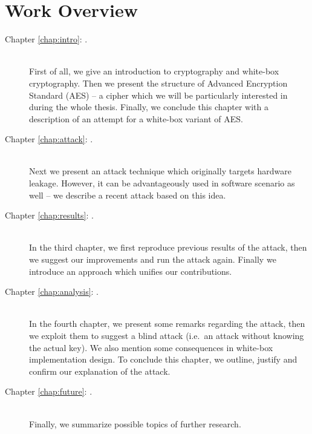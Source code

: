 \section*{Work Overview}
	\begin{description}
		\item[Chapter \ref{chap:intro}: .] ~ \\
			First of all, we give an introduction to cryptography and white-box cryptography. Then we present the structure of Advanced Encryption Standard (AES) -- a cipher which we will be particularly interested in during the whole thesis. Finally, we conclude this chapter with a description of an attempt for a white-box variant of AES.
		\item[Chapter \ref{chap:attack}: .] ~ \\
			Next we present an attack technique which originally targets hardware leakage. However, it can be advantageously used in software scenario as well -- we describe a recent attack based on this idea.
		\item[Chapter \ref{chap:results}: .] ~ \\
			In the third chapter, we first reproduce previous results of the attack, then we suggest our improvements and run the attack again. Finally we introduce an approach which unifies our contributions.
		\item[Chapter \ref{chap:analysis}: .] ~ \\
			In the fourth chapter, we present some remarks regarding the attack, then we exploit them to suggest a blind attack (i.e.\ an attack without knowing the actual key). We also mention some consequences in white-box implementation design. To conclude this chapter, we outline, justify and confirm our explanation of the attack.
		\item[Chapter \ref{chap:future}: .] ~ \\
			Finally, we summarize possible topics of further research.
	\end{description}
